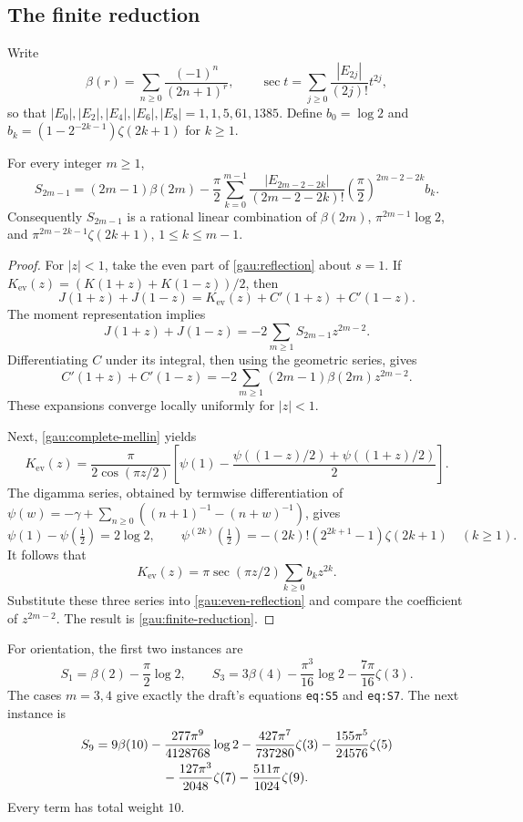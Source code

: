 \subsection{The finite reduction}

Write
\[
 \beta(r)=\sum_{n\geq0}\frac{(-1)^n}{(2n+1)^r},
 \qquad
 \sec t=\sum_{j\geq0}\frac{|E_{2j}|}{(2j)!}t^{2j},
\]
so that $|E_0|,|E_2|,|E_4|,|E_6|,|E_8|=1,1,5,61,1385$.
Define $b_0=\log2$ and
$b_k=(1-2^{-2k-1})\zeta(2k+1)$ for $k\geq1$.

\begin{theorem}\label{gau:all-weights}
For every integer $m\geq1$,
\begin{equation}\label{gau:finite-reduction}
 \boxed{\displaystyle
 S_{2m-1}=(2m-1)\beta(2m)
 -\frac\pi2\sum_{k=0}^{m-1}
 \frac{|E_{2m-2-2k}|}{(2m-2-2k)!}
       \left(\frac\pi2\right)^{2m-2-2k}b_k.}
\end{equation}
Consequently $S_{2m-1}$ is a rational linear combination of
$\beta(2m)$, $\pi^{2m-1}\log2$, and
$\pi^{2m-2k-1}\zeta(2k+1)$, $1\leq k\leq m-1$.
\end{theorem}
\begin{proof}
For $|z|<1$, take the even part of \eqref{gau:reflection} about $s=1$.
If $K_{\mathrm{ev}}(z)=(K(1+z)+K(1-z))/2$, then
\begin{equation}\label{gau:even-reflection}
 J(1+z)+J(1-z)
 =K_{\mathrm{ev}}(z)+C'(1+z)+C'(1-z).
\end{equation}
The moment representation implies
\[
 J(1+z)+J(1-z)=-2\sum_{m\geq1}S_{2m-1}z^{2m-2}.
\]
Differentiating $C$ under its integral, then using the geometric series,
gives
\[
 C'(1+z)+C'(1-z)
 =-2\sum_{m\geq1}(2m-1)\beta(2m)z^{2m-2}.
\]
These expansions converge locally uniformly for $|z|<1$.

Next, \eqref{gau:complete-mellin} yields
\[
 K_{\mathrm{ev}}(z)=\frac\pi{2\cos(\pi z/2)}
 \left[\psi(1)-\frac{\psi((1-z)/2)+\psi((1+z)/2)}2\right].
\]
The digamma series, obtained by termwise differentiation of
$\psi(w)=-\gamma+\sum_{n\geq0}((n+1)^{-1}-(n+w)^{-1})$, gives
\[
 \psi(1)-\psi(\tfrac12)=2\log2,
 \qquad
 \psi^{(2k)}(\tfrac12)=-(2k)!(2^{2k+1}-1)\zeta(2k+1)
 \quad(k\geq1).
\]
It follows that
\[
 K_{\mathrm{ev}}(z)
 =\pi\sec(\pi z/2)\sum_{k\geq0}b_k z^{2k}.
\]
Substitute these three series into \eqref{gau:even-reflection} and compare
the coefficient of $z^{2m-2}$. The result is
\eqref{gau:finite-reduction}.
\end{proof}

For orientation, the first two instances are
\[
 S_1=\beta(2)-\frac\pi2\log2,
 \qquad
 S_3=3\beta(4)-\frac{\pi^3}{16}\log2
                     -\frac{7\pi}{16}\zeta(3).
\]
The cases $m=3,4$ give exactly the draft's equations
\texttt{eq:S5} and \texttt{eq:S7}. The next instance is
\begin{align}\label{gau:s9}
 S_9={}&9\beta(10)-\frac{277\pi^9}{4128768}\log2
       -\frac{427\pi^7}{737280}\zeta(3)
       -\frac{155\pi^5}{24576}\zeta(5)\nonumber\\
     &\hspace{14mm}-\frac{127\pi^3}{2048}\zeta(7)
       -\frac{511\pi}{1024}\zeta(9).
\end{align}
Every term has total weight $10$.

